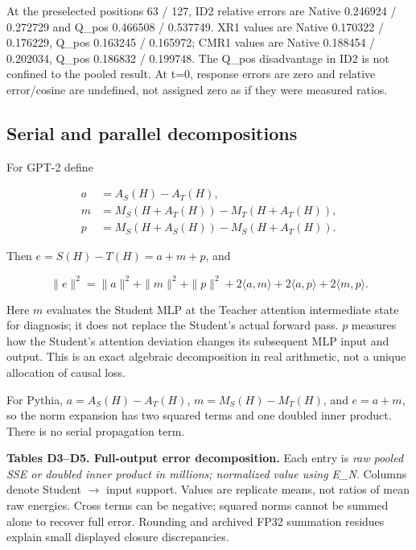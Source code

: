 At the preselected positions 63 / 127, ID2 relative errors are Native 0.246924 / 0.272729 and Q\_pos 0.466508 / 0.537749. XR1 values are Native 0.170322 / 0.176229, Q\_pos 0.163245 / 0.165972; CMR1 values are Native 0.188454 / 0.202034, Q\_pos 0.186832 / 0.199748. The Q\_pos disadvantage in ID2 is not confined to the pooled result. At t=0, response errors are zero and relative error/cosine are undefined, not assigned zero as if they were measured ratios.

\subsection{Serial and parallel decompositions}\label{serial-and-parallel-decompositions}

For GPT-2 define

\[\begin{aligned}
a&=A_S(H)-A_T(H),\\
m&=M_S(H+A_T(H))-M_T(H+A_T(H)),\\
p&=M_S(H+A_S(H))-M_S(H+A_T(H)).
\end{aligned}\]

Then \(e=S(H)-T(H)=a+m+p\), and

\[\|e\|^2=\|a\|^2+\|m\|^2+\|p\|^2
+2\langle a,m\rangle+2\langle a,p\rangle+2\langle m,p\rangle.\]

Here \(m\) evaluates the Student MLP at the Teacher attention intermediate state for diagnosis; it does not replace the Student's actual forward pass. \(p\) measures how the Student's attention deviation changes its subsequent MLP input and output. This is an exact algebraic decomposition in real arithmetic, not a unique allocation of causal loss.

For Pythia, \(a=A_S(H)-A_T(H)\), \(m=M_S(H)-M_T(H)\), and \(e=a+m\), so the norm expansion has two squared terms and one doubled inner product. There is no serial propagation term.

\textbf{Tables D3--D5. Full-output error decomposition.} Each entry is \emph{raw pooled SSE or doubled inner product in millions; normalized value using E\_N}. Columns denote Student \(\rightarrow\) input support. Values are replicate means, not ratios of mean raw energies. Cross terms can be negative; squared norms cannot be summed alone to recover full error. Rounding and archived FP32 summation residues explain small displayed closure discrepancies.

